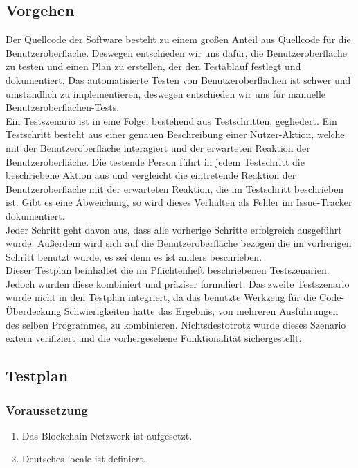 \documentclass[parskip=full]{scrartcl}
\begin{document}
\subsection{Vorgehen}
Der Quellcode der Software besteht zu einem großen Anteil aus Quellcode für die Benutzeroberfläche. Deswegen entschieden wir uns dafür, die Benutzeroberfläche zu testen und einen Plan zu erstellen, der den Testablauf festlegt und dokumentiert. Das automatisierte Testen von Benutzeroberflächen ist schwer und umständlich zu implementieren, deswegen entschieden wir uns für manuelle Benutzeroberflächen-Tests.
\\
Ein Testszenario ist in eine Folge, bestehend aus Testschritten, gegliedert. Ein Testschritt besteht aus einer genauen Beschreibung einer Nutzer-Aktion, welche mit der Benutzeroberfläche interagiert und der erwarteten Reaktion der Benutzeroberfläche. Die testende Person führt in jedem Testschritt die beschriebene Aktion aus und vergleicht die eintretende Reaktion der Benutzeroberfläche mit der erwarteten Reaktion, die im Testschritt beschrieben ist. Gibt es eine Abweichung, so wird dieses Verhalten als Fehler im Issue-Tracker dokumentiert.
\\
Jeder Schritt geht davon aus, dass alle vorherige Schritte erfolgreich ausgeführt wurde. Außerdem wird sich auf die Benutzeroberfläche bezogen die im vorherigen Schritt benutzt wurde, es sei denn es ist anders beschrieben.
\\
Dieser Testplan beinhaltet die im Pflichtenheft beschriebenen Testszenarien. Jedoch wurden diese kombiniert und präziser formuliert.
Das zweite Testszenario wurde nicht in den Testplan integriert, da das benutzte Werkzeug für die Code-Überdeckung Schwierigkeiten hatte das Ergebnis, von mehreren Ausführungen des selben Programmes, zu kombinieren. Nichtsdestotrotz wurde dieses Szenario extern verifiziert und die vorhergesehene Funktionalität sichergestellt.

\subsection{Testplan}
\subsubsection{Voraussetzung}
\begin{enumerate}
		\item Das Blockchain-Netzwerk ist aufgesetzt.
		\item Deutsches locale ist definiert.
\end{enumerate}
\end{document}
